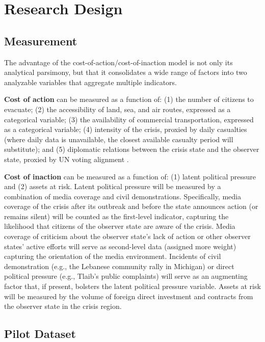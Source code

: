 \documentclass[12pt]{article}
\begin{document}
\section{Research Design}

\subsection{Measurement}

The advantage of the cost-of-action/cost-of-inaction model is not only its analytical parsimony, but that it consolidates a wide range of factors into two analyzable variables that aggregate multiple indicators.

\textbf{Cost of action} can be measured as a function of: (1) the number of citizens to evacuate; (2) the accessibility of land, sea, and air routes, expressed as a categorical variable; (3) the availability of commercial transportation, expressed as a categorical variable; (4) intensity of the crisis, proxied by daily casualties (where daily data is unavailable, the closest available casualty period will substitute); and (5) diplomatic relations between the crisis state and the observer state, proxied by UN voting alignment \citep{Bailey2016}.

\textbf{Cost of inaction} can be measured as a function of: (1) latent political pressure and (2) assets at risk. Latent political pressure will be measured by a combination of media coverage and civil demonstrations. Specifically, media coverage of the crisis after its outbreak and before the state announces action (or remains silent) will be counted as the first-level indicator, capturing the likelihood that citizens of the observer state are aware of the crisis. Media coverage of criticism about the observer state's lack of action or other observer states' active efforts will serve as second-level data (assigned more weight) capturing the orientation of the media environment. Incidents of civil demonstration (e.g., the Lebanese community rally in Michigan) or direct political pressure (e.g., Tlaib's public complaints) will serve as an augmenting factor that, if present, bolsters the latent political pressure variable. Assets at risk will be measured by the volume of foreign direct investment and contracts from the observer state in the crisis region.

\subsection{Pilot Dataset}
\end{document}
